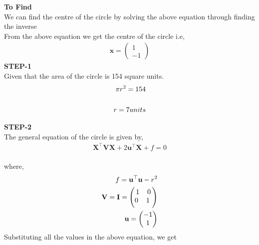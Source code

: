\documentclass[10pt,a4paper]{report}
\newcommand{\myvec}[1]{\ensuremath{\begin{pmatrix}#1\end{pmatrix}}}
\let\vec\mathbf
\let\vec\mathbf
\begin{document}
\begin{multicols}{2}
\textbf{To Find }\vspace{2mm}\\
We can find the centre of the circle by solving the above equation through finding the inverse \vspace{2mm}  \\ 
From the above equation we get the centre of the circle i.e, \\\vspace{1mm}
\begin{align}
    \vec{x} =
    \myvec{
    1\\
    -1
    }
\end{align}
\textbf{STEP-1}\vspace{2mm}\\
Given that the area of the circle is 154 square units. \\ \vspace{1mm}
\begin{align}
    \pi{r^2} = 154
    \\ \vspace{1mm}
    \\
    {r} = 7 units
\end{align}

\textbf{STEP-2}\vspace{2mm}\\
The general equation of the circle is given by,\\ \vspace{1mm}
\begin{align}
    \textbf{X}^\top \textbf{V}\textbf{X}+2\textbf{u}^\top\textbf{X}+{f} = 0
\end{align}
\\
where, \\ \vspace{1mm}
\begin{align}
    f = \textbf{u}^\top\textbf{u}-{r}^2\\
    \textbf{V}=\vec{I}=\myvec{
    1 \hspace{4mm} 0 \\ \vspace{1mm}
    0 \hspace{4mm} 1 \
    }
    \\ \vspace{1mm}
    \textbf{u}=\myvec{
    {-1}
    \\
    {1}
    }
\end{align}
Substituting all the values in the above equation, we get \\


\end{multicols}
\end{document}
